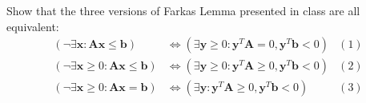 



    \begin{thm}{}{}
        Show that the three versions of Farkas Lemma presented in class are all equivalent:
        \begin{align*}
            (\neg \exists \mathbf{x}: \mathbf{A}\mathbf{x}\le \mathbf{b}) &\iff (\exists \mathbf{y}\ge 0 :\mathbf{y}^{T}\mathbf{A}=0,\mathbf{y}^{T}\mathbf{b}<0) &(1)\\
            (\neg \exists \mathbf{x}\ge 0: \mathbf{A}\mathbf{x}\le \mathbf{b}) &\iff (\exists \mathbf{y}\ge 0 :\mathbf{y}^{T}\mathbf{A}\ge 0,\mathbf{y}^{T}\mathbf{b}<0) &(2)\\
            (\neg \exists \mathbf{x}\ge 0: \mathbf{A}\mathbf{x}= \mathbf{b}) &\iff (\exists \mathbf{y} :\mathbf{y}^{T}\mathbf{A}\ge 0,\mathbf{y}^{T}\mathbf{b}<0)&(3)
        \end{align*}
    \end{thm}
